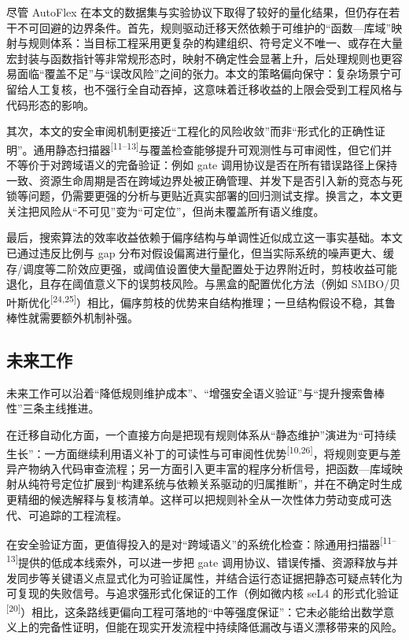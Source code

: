 \documentclass[UTF8,a4paper,12pt,twoside]{ctexart}  %
\begin{document}
尽管 AutoFlex 在本文的数据集与实验协议下取得了较好的量化结果，但仍存在若干不可回避的边界条件。首先，规则驱动迁移天然依赖于可维护的``函数---库域''映射与规则体系：当目标工程采用更复杂的构建组织、符号定义不唯一、或存在大量宏封装与函数指针等非常规形态时，映射不确定性会显著上升，后处理规则也更容易面临``覆盖不足''与``误改风险''之间的张力。本文的策略偏向保守：复杂场景宁可留给人工复核，也不强行全自动吞掉，这意味着迁移收益的上限会受到工程风格与代码形态的影响。

其次，本文的安全审阅机制更接近``工程化的风险收敛''而非``形式化的正确性证明''。通用静态扫描器\textsuperscript{[11--13]}与覆盖检查能够提升可观测性与可审阅性，但它们并不等价于对跨域语义的完备验证：例如 gate 调用协议是否在所有错误路径上保持一致、资源生命周期是否在跨域边界处被正确管理、并发下是否引入新的竞态与死锁等问题，仍需要更强的分析与更贴近真实部署的回归测试支撑。换言之，本文更关注把风险从``不可见''变为``可定位''，但尚未覆盖所有语义维度。

最后，搜索算法的效率收益依赖于偏序结构与单调性近似成立这一事实基础。本文已通过违反比例与 gap 分布对假设偏离进行量化，但当实际系统的噪声更大、缓存/调度等二阶效应更强，或阈值设置使大量配置处于边界附近时，剪枝收益可能退化，且存在阈值意义下的误剪枝风险。与黑盒的配置优化方法（例如 SMBO/贝叶斯优化\textsuperscript{[24,25]}）相比，偏序剪枝的优势来自结构推理；一旦结构假设不稳，其鲁棒性就需要额外机制补强。

\subsection{未来工作}

未来工作可以沿着``降低规则维护成本''、``增强安全语义验证''与``提升搜索鲁棒性''三条主线推进。

在迁移自动化方面，一个直接方向是把现有规则体系从``静态维护''演进为``可持续生长''：一方面继续利用语义补丁的可读性与可审阅性优势\textsuperscript{[10,26]}，将规则变更与差异产物纳入代码审查流程；另一方面引入更丰富的程序分析信号，把函数---库域映射从纯符号定位扩展到``构建系统与依赖关系驱动的归属推断''，并在不确定时生成更精细的候选解释与复核清单。这样可以把规则补全从一次性体力劳动变成可迭代、可追踪的工程流程。

在安全验证方面，更值得投入的是对``跨域语义''的系统化检查：除通用扫描器\textsuperscript{[11--13]}提供的低成本线索外，可以进一步把 gate 调用协议、错误传播、资源释放与并发同步等关键语义点显式化为可验证属性，并结合运行态证据把静态可疑点转化为可复现的失败信号。与追求强形式化保证的工作（例如微内核 seL4 的形式化验证\textsuperscript{[20]}）相比，这条路线更偏向工程可落地的``中等强度保证''：它未必能给出数学意义上的完备性证明，但能在现实开发流程中持续降低漏改与语义漂移带来的风险。
\end{document}
